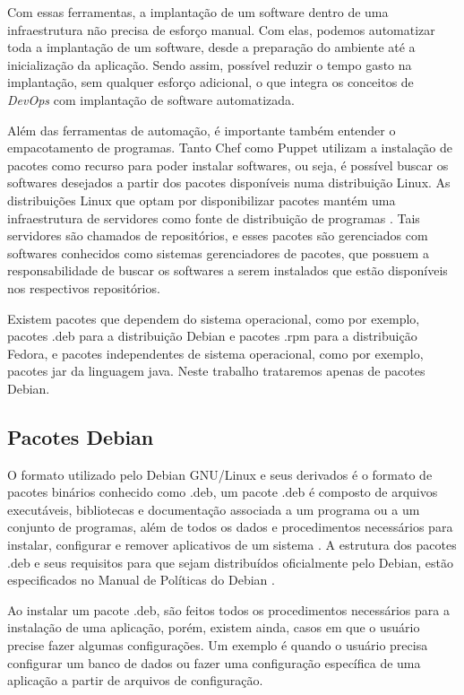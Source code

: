 Com essas ferramentas, a implantação de um software dentro de uma infraestrutura
não precisa de  esforço manual. Com elas, podemos automatizar toda a implantação
de um software, desde a preparação do ambiente até a inicialização da aplicação. 
Sendo assim, possível reduzir o tempo gasto na implantação, sem qualquer esforço
adicional, o que integra os conceitos de \textit{DevOps} com implantação de 
software automatizada.

Além das ferramentas de automação, é importante também entender o empacotamento de
programas. Tanto Chef como Puppet utilizam a instalação de pacotes como recurso para
poder instalar softwares, ou seja, é possível buscar os softwares desejados a partir
dos pacotes disponíveis numa distribuição Linux. As distribuições Linux que
optam por disponibilizar pacotes mantém uma infraestrutura de servidores como fonte
de distribuição de programas \cite{araujo2011apprecommender}. Tais servidores são
chamados de repositórios, e esses pacotes são gerenciados com softwares conhecidos
como sistemas gerenciadores de pacotes, que possuem a responsabilidade de buscar
os softwares a serem instalados que estão disponíveis nos respectivos repositórios.

Existem pacotes que dependem do sistema operacional, como por exemplo, pacotes .deb
para a distribuição Debian e pacotes .rpm para a distribuição Fedora, e
pacotes independentes de sistema operacional, como por exemplo, pacotes jar da
linguagem java. Neste trabalho trataremos apenas de pacotes Debian.


\subsection{Pacotes Debian}

O formato utilizado pelo Debian GNU/Linux e seus derivados é o formato de pacotes
binários conhecido como .deb, um pacote .deb é composto de arquivos executáveis,
bibliotecas e documentação associada a um programa ou a um conjunto de programas,
além de todos os dados e procedimentos necessários para instalar, configurar e remover
aplicativos de um sistema \cite{araujo2011apprecommender}. A estrutura dos pacotes 
.deb e seus requisitos para que sejam distribuídos oficialmente pelo Debian,
estão especificados no Manual de Políticas do Debian \cite{debian}.

Ao instalar um pacote .deb, são feitos todos os procedimentos necessários para a instalação
de uma aplicação, porém, existem ainda, casos em que o usuário precise fazer algumas
configurações. Um exemplo é quando o usuário precisa configurar um banco de dados
ou fazer uma configuração específica de uma aplicação a partir de arquivos de configuração.

